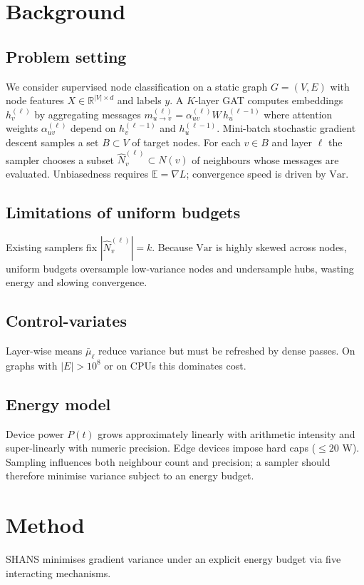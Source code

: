 \documentclass{article}
\begin{document}
\section{Background}
\subsection{Problem setting}
We consider supervised node classification on a static graph \(G=(V,E)\) with node features \(X\in\mathbb{R}^{|V|\times d}\) and labels \(y\). A \(K\)-layer GAT computes embeddings \(h_v^{(\ell)}\) by aggregating messages \(m_{u\to v}^{(\ell)}=\alpha_{uv}^{(\ell)}W\,h_u^{(\ell-1)}\) where attention weights \(\alpha_{uv}^{(\ell)}\) depend on \(h_v^{(\ell-1)}\) and \(h_u^{(\ell-1)}\). Mini-batch stochastic gradient descent samples a set \(B\subset V\) of target nodes. For each \(v\in B\) and layer \(\ell\) the sampler chooses a subset \(\hat{N}_v^{(\ell)}\subset N(v)\) of neighbours whose messages are evaluated. Unbiasedness requires \(\mathbb{E}=\nabla L\); convergence speed is driven by \(\mathrm{Var}\).
\subsection{Limitations of uniform budgets}
Existing samplers fix \(|\hat{N}_v^{(\ell)}|=k\). Because \(\mathrm{Var}\) is highly skewed across nodes, uniform budgets oversample low-variance nodes and undersample hubs, wasting energy and slowing convergence.
\subsection{Control-variates}
Layer-wise means \(\bar{\mu}_\ell\) reduce variance but must be refreshed by dense passes. On graphs with \(|E|>10^8\) or on CPUs this dominates cost.
\subsection{Energy model}
Device power \(P(t)\) grows approximately linearly with arithmetic intensity and super-linearly with numeric precision. Edge devices impose hard caps (\(\le 20\) W). Sampling influences both neighbour count and precision; a sampler should therefore minimise variance subject to an energy budget.

\section{Method}
SHANS minimises gradient variance under an explicit energy budget via five interacting mechanisms.
\end{document}
